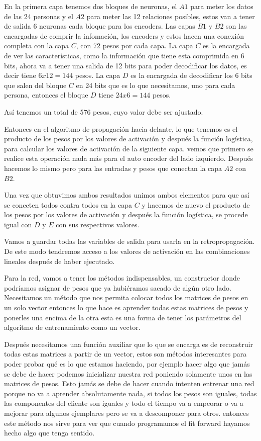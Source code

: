 En la primera capa tenemos dos bloques de neuronas, el $A1$ para meter los datos de las 24 personas y el $A2$ para meter las 12 relaciones posibles, estos van a tener de salida 6 neuronas cada bloque para los encoders. Las capas $B1$ y $B2$ son las encargadas de comprir la infomación, los encoders y estos hacen una conexión completa con la capa $C$, con 72 pesos por cada capa. La capa $C$ es la encargada de ver las características, como la información que tiene esta comprimida en 6 bits, ahora va a tener una salida de 12 bits para poder decodificar los datos, es decir tiene $6x12=144$ pesos. 
La capa $D$ es la encargada de decodificar los 6 bits que salen del bloque $C$ en 24 bits que es lo que necesitamos, uno para cada persona, entonces el bloque $D$ tiene $24x6=144$ pesos.

Así tenemos un total de 576 pesos, cuyo valor debe ser ajustado.

Entonces en el algoritmo de propagación hacia delante, lo que tenemos es el producto de los pesos por los valores de activación y después la función logística, para calcular los valores de activación de la siguiente capa. vemos que primero se realice esta operación nada más para el auto encoder del lado izquierdo. Después hacemos lo mismo pero para las entradas y pesos que conectan la capa $A2$ con $B2$. 

Una vez que obtuvimos ambos resultados unimos ambos elementos para que así se conecten todos contra todos en la capa $C$ y hacemos de nuevo el producto de los pesos por los valores de activación y después la función logística, se procede igual con $D$ y $E$ con sus respectivos valores.

Vamos a guardar todas las variables de salida para usarla en la retropropagación. De este modo tendremos acceso a los valores de activación en las combinaciones lineales después de haber ejecutado. 

Para la red, vamos a tener los métodos indispensables, un constructor donde podríamos asignar de pesos que ya hubiéramos sacado de algún otro lado.
Necesitamos un método que nos permita colocar todos los matrices de pesos en un solo vector entonces lo que hace es aprender todas estas matrices de pesos y ponerles una encima de la otra esta es una forma de tener los parámetros del algoritmo de entrenamiento como un vector. 

Después necesitamos una función auxiliar que lo que se encarga es de reconstruir todas estas matrices a partir de un vector, estos son métodos interesantes para poder probar qué es lo que estamos haciendo, por ejemplo hacer algo que jamás se debe de hacer podemos inicializar nuestra  red poniendo solamente unos en las matrices de pesos. Esto jamás se debe de hacer cuando intenten entrenar una red porque no va a aprender absolutamente nada, si todos los pesos son iguales, todas las componentes del cliente son iguales y todo el tiempo va a empeorar o va a mejorar para algunos ejemplares pero se va a descomponer para otros. entonces este método nos sirve para ver que cuando programamos el fit forward hayamos hecho algo que tenga sentido.

